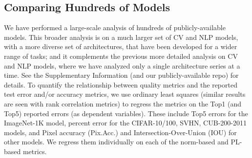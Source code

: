 \subsection{Comparing Hundreds of Models}
\label{sxn:all_cv_models}


We have performed a large-scale analysis of hundreds of publicly-available models.
This broader analysis is on a much larger set of CV and NLP models, with a more diverse set of architectures, that have been developed for a wider range of tasks; and it complements the previous more detailed analysis on CV and NLP models, where we have analyzed only a single architecture series at a time.
See the Supplementary Information
(and our publicly-available repo)
for details.
To quantify the relationship between quality metrics and the reported test error and/or accuracy metrics, we use ordinary least squares (similar results are seen with rank correlation metrics) to regress the metrics on the Top1 (and Top5) reported errors (as dependent variables).
These include Top5 errors for the ImageNet-1K model, percent error for the CIFAR-10/100, SVHN, CUB-200-2011 models, and Pixel accuracy (Pix.Acc.) and Intersection-Over-Union (IOU) for other models.
We regress them individually on each of the norm-based and PL-based metrics.


